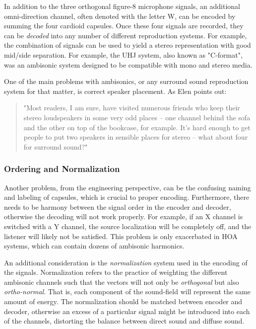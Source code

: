 In addition to the three orthogonal figure-8 microphone signals, an additional omni-direction channel, often denoted with the letter W, can be encoded by summing the four cardioid capsules. Once these four signals are recorded, they can be \textit{decoded} into any number of different reproduction systems. For example, the combination of signals can be used to yield a stereo representation with good mid/side separation. For example, the UHJ system, also known as "C-format", was an ambisonic system designed to be compatible with mono and stereo media. 

One of the main problems with ambisonics, or any surround sound reproduction system for that matter, is correct speaker placement. As Elen \cite{elen1991whatever} points out:

\begin{quote}
    "Most readers, I am sure, have visited numerous friends who keep their stereo loudspeakers in some very odd places -- one channel behind the sofa and the other on top of the bookcase, for example. It’s hard enough to get people to put two speakers in sensible places for stereo -- what about four for surround sound?"
\end{quote}

\subsubsection{Ordering and Normalization}

Another problem, from the engineering perspective, can be the confusing naming and labeling of capsules, which is crucial to proper encoding. Furthermore, there needs to be harmony between the signal order in the encoder and decoder, otherwise the decoding will not work properly. For example, if an X channel is switched with a Y channel, the source localization will be completely off, and the listener will likely not be satisfied. This problem is only exacerbated in HOA systems, which can contain dozens of ambisonic harmonics. 

An additional consideration is the \textit{normalization} system used in the encoding of the signals. Normalization refers to the practice of weighting the different ambisonic channels such that the vectors will not only be \textit{orthogonal} but also \textit{ortho-normal}. That is, each component of the sound-field will represent the same amount of energy. The normalization should be matched between encoder and decoder, otherwise an excess of a particular signal might be introduced into each of the channels, distorting the balance between direct sound and diffuse sound. 


